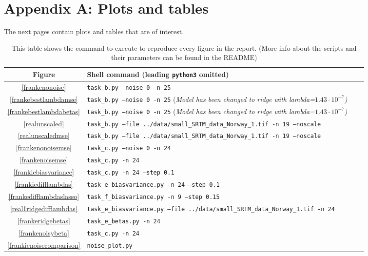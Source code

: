 \documentclass[onecolumn,10pt,cleanfoot]{asme2ej}
\begin{document}



\section*{Appendix A: Plots and tables}

The next pages contain plots and tables that are of interest.

\begin{table*}
\caption{This table shows the command to execute to reproduce every figure in the report. (More info about the scripts and their parameters can be found in the README)}
\begin{center}
\label{allparamstable}
\begin{tabular}{c | l l l}
Figure & Shell command (leading \texttt{python3} omitted) \\
\hline
\ref{frankenonoise} & \texttt{task\_b.py --noise 0 -n 25}\\
\ref{frankebestlambdamse} & \texttt{task\_b.py --noise 0 -n 25} \footnotesize{(\it Model has been changed to ridge with lambda=$1.43 \cdot 10^{-7}$)}\\
\ref{frankebestlambdabetas} & \texttt{task\_b.py --noise 0 -n 25} \footnotesize{(\it Model has been changed to ridge with lambda=$1.43 \cdot 10^{-7}$)}\\
\ref{realunscaled} & \texttt{task\_b.py --file ../data/small\_SRTM\_data\_Norway\_1.tif -n 19 --noscale}\\
\ref{realunscaledmse} & \texttt{task\_b.py --file ../data/small\_SRTM\_data\_Norway\_1.tif -n 19 --noscale}\\
\ref{frankenonoisemse} & \texttt{task\_c.py --noise 0 -n 24}\\
\ref{frankenoisemse} & \texttt{task\_c.py -n 24}\\
\ref{frankiebiasvariance} & \texttt{task\_c.py -n 24 --step 0.1}\\
\ref{frankiedifflambdas} & \texttt{task\_e\_biasvariance.py -n 24 --step 0.1}\\
\ref{frankedifflambdaslasso} & \texttt{task\_f\_biasvariance.py -n 9 --step 0.15}\\
\ref{real1ridgedifflambdas} & \texttt{task\_e\_biasvariance.py --file ../data/small\_SRTM\_data\_Norway\_1.tif -n 24}\\
\ref{frankeridgebetas} & \texttt{task\_e\_betas.py -n 24}\\
\ref{frankenoisybeta} & \texttt{task\_c.py -n 24}\\
\ref{frankienoisecomparison} & \texttt{noise\_plot.py}\\

\end{tabular}
\end{center}
\end{table*}
\end{document}
